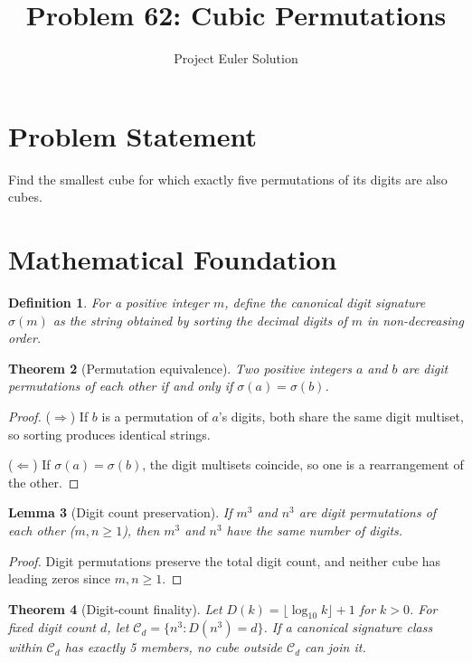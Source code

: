 \documentclass[12pt,a4paper]{article}
\title{Problem 62: Cubic Permutations}
\author{Project Euler Solution}
\date{}
\newtheorem{theorem}{Theorem}
\newtheorem{lemma}[theorem]{Lemma}
\newtheorem{definition}[theorem]{Definition}
\begin{document}
\maketitle

\section{Problem Statement}

Find the smallest cube for which exactly five permutations of its digits are also cubes.

\section{Mathematical Foundation}

\begin{definition}
For a positive integer $m$, define the \emph{canonical digit signature} $\sigma(m)$ as the string obtained by sorting the decimal digits of $m$ in non-decreasing order.
\end{definition}

\begin{theorem}[Permutation equivalence]
Two positive integers $a$ and $b$ are digit permutations of each other if and only if $\sigma(a) = \sigma(b)$.
\end{theorem}

\begin{proof}
($\Rightarrow$) If $b$ is a permutation of $a$'s digits, both share the same digit multiset, so sorting produces identical strings.

($\Leftarrow$) If $\sigma(a) = \sigma(b)$, the digit multisets coincide, so one is a rearrangement of the other.
\end{proof}

\begin{lemma}[Digit count preservation]
If $m^3$ and $n^3$ are digit permutations of each other ($m, n \ge 1$), then $m^3$ and $n^3$ have the same number of digits.
\end{lemma}

\begin{proof}
Digit permutations preserve the total digit count, and neither cube has leading zeros since $m, n \ge 1$.
\end{proof}

\begin{theorem}[Digit-count finality]
Let $D(k) = \lfloor \log_{10} k \rfloor + 1$ for $k > 0$. For fixed digit count $d$, let $\mathcal{C}_d = \{n^3 : D(n^3) = d\}$. If a canonical signature class within $\mathcal{C}_d$ has exactly 5 members, no cube outside $\mathcal{C}_d$ can join it.
\end{theorem}
\end{document}
